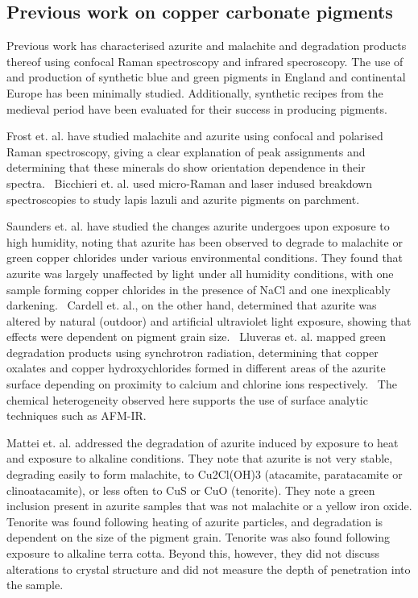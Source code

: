 \subsection[Previous work on copper carbonate pigments]{Previous work on copper carbonate pigments}
\label{subsection1.2.2}

Previous work has characterised azurite and malachite and degradation products thereof using confocal Raman spectroscopy and infrared specroscopy. The use of and production of synthetic blue and green pigments in England and continental Europe has been minimally studied. Additionally, synthetic recipes from the medieval period have been evaluated for their success in producing pigments.

Frost et. al. have studied malachite and azurite using confocal and polarised Raman spectroscopy, giving a clear explanation of peak assignments and determining that these minerals do show orientation dependence in their spectra.~\cite{frost} Bicchieri et. al. used micro-Raman and laser indused breakdown spectroscopies to study lapis lazuli and azurite pigments on parchment.~\cite{bicchieri} 

Saunders et. al. have studied the changes azurite undergoes upon exposure to high humidity, noting that azurite has been observed to degrade to malachite or green copper chlorides under various environmental conditions. They found that azurite was largely unaffected by light under all humidity conditions, with one sample forming copper chlorides in the presence of NaCl and one inexplicably darkening.~\cite{saunders} Cardell et. al., on the other hand, determined that azurite was altered by natural (outdoor) and artificial ultraviolet light exposure, showing that effects were dependent on pigment grain size.~\cite{cardell} Lluveras et. al. mapped green degradation products using synchrotron radiation, determining that copper oxalates and copper hydroxychlorides formed in different areas of the azurite surface depending on proximity to calcium and chlorine ions respectively.~\cite{lluveras} The chemical heterogeneity observed here supports the use of surface analytic techniques such as AFM-IR. 

Mattei et. al. addressed the degradation of azurite induced by exposure to heat and exposure to alkaline conditions. They note that azurite is not very stable, degrading easily to form malachite, to Cu2Cl(OH)3 (atacamite, paratacamite or clinoatacamite), or less often to CuS or CuO (tenorite). They note a green inclusion present in azurite samples that was not malachite or a yellow iron oxide. Tenorite was found following heating of azurite particles, and degradation is dependent on the size of the pigment grain. Tenorite was also found following exposure to alkaline terra cotta. Beyond this, however, they did not discuss alterations to crystal structure and did not measure the depth of penetration into the sample.~\cite{mattei} 

